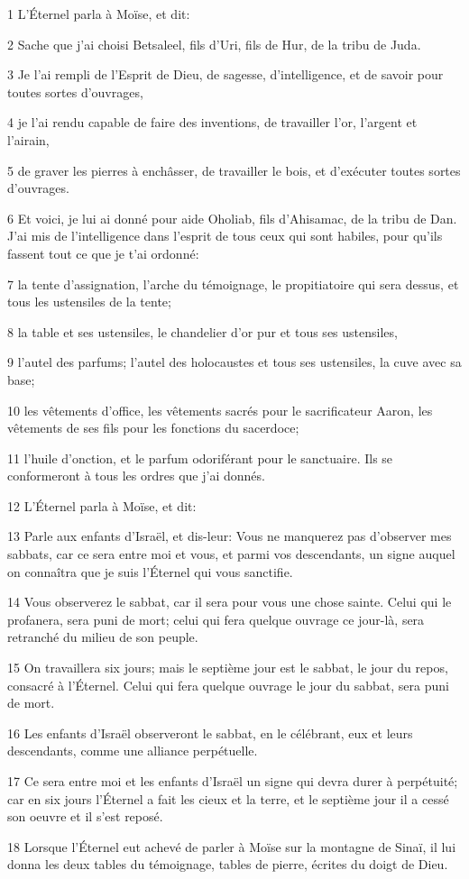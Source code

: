 \par 1 L'Éternel parla à Moïse, et dit:
\par 2 Sache que j'ai choisi Betsaleel, fils d'Uri, fils de Hur, de la tribu de Juda.
\par 3 Je l'ai rempli de l'Esprit de Dieu, de sagesse, d'intelligence, et de savoir pour toutes sortes d'ouvrages,
\par 4 je l'ai rendu capable de faire des inventions, de travailler l'or, l'argent et l'airain,
\par 5 de graver les pierres à enchâsser, de travailler le bois, et d'exécuter toutes sortes d'ouvrages.
\par 6 Et voici, je lui ai donné pour aide Oholiab, fils d'Ahisamac, de la tribu de Dan. J'ai mis de l'intelligence dans l'esprit de tous ceux qui sont habiles, pour qu'ils fassent tout ce que je t'ai ordonné:
\par 7 la tente d'assignation, l'arche du témoignage, le propitiatoire qui sera dessus, et tous les ustensiles de la tente;
\par 8 la table et ses ustensiles, le chandelier d'or pur et tous ses ustensiles,
\par 9 l'autel des parfums; l'autel des holocaustes et tous ses ustensiles, la cuve avec sa base;
\par 10 les vêtements d'office, les vêtements sacrés pour le sacrificateur Aaron, les vêtements de ses fils pour les fonctions du sacerdoce;
\par 11 l'huile d'onction, et le parfum odoriférant pour le sanctuaire. Ils se conformeront à tous les ordres que j'ai donnés.
\par 12 L'Éternel parla à Moïse, et dit:
\par 13 Parle aux enfants d'Israël, et dis-leur: Vous ne manquerez pas d'observer mes sabbats, car ce sera entre moi et vous, et parmi vos descendants, un signe auquel on connaîtra que je suis l'Éternel qui vous sanctifie.
\par 14 Vous observerez le sabbat, car il sera pour vous une chose sainte. Celui qui le profanera, sera puni de mort; celui qui fera quelque ouvrage ce jour-là, sera retranché du milieu de son peuple.
\par 15 On travaillera six jours; mais le septième jour est le sabbat, le jour du repos, consacré à l'Éternel. Celui qui fera quelque ouvrage le jour du sabbat, sera puni de mort.
\par 16 Les enfants d'Israël observeront le sabbat, en le célébrant, eux et leurs descendants, comme une alliance perpétuelle.
\par 17 Ce sera entre moi et les enfants d'Israël un signe qui devra durer à perpétuité; car en six jours l'Éternel a fait les cieux et la terre, et le septième jour il a cessé son oeuvre et il s'est reposé.
\par 18 Lorsque l'Éternel eut achevé de parler à Moïse sur la montagne de Sinaï, il lui donna les deux tables du témoignage, tables de pierre, écrites du doigt de Dieu.

